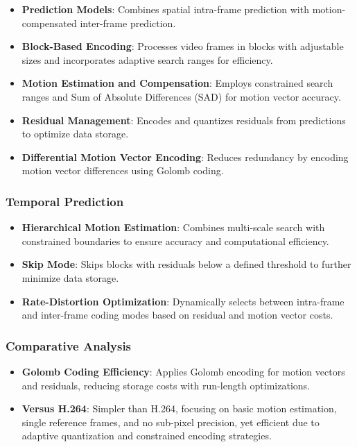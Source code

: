 \documentclass[a4paper,14pt]{article}
\begin{document}
\begin{itemize}
\item \textbf{Prediction Models}: Combines spatial intra-frame prediction with motion-compensated inter-frame prediction.
\item \textbf{Block-Based Encoding}: Processes video frames in blocks with adjustable sizes and incorporates adaptive search ranges for efficiency.
\item \textbf{Motion Estimation and Compensation}: Employs constrained search ranges and Sum of Absolute Differences (SAD) for motion vector accuracy.
\item \textbf{Residual Management}: Encodes and quantizes residuals from predictions to optimize data storage.
\item \textbf{Differential Motion Vector Encoding}: Reduces redundancy by encoding motion vector differences using Golomb coding.
\end{itemize}

\subsubsection{Temporal Prediction}
\begin{itemize}
\item \textbf{Hierarchical Motion Estimation}: Combines multi-scale search with constrained boundaries to ensure accuracy and computational efficiency.
\item \textbf{Skip Mode}: Skips blocks with residuals below a defined threshold to further minimize data storage.
\item \textbf{Rate-Distortion Optimization}: Dynamically selects between intra-frame and inter-frame coding modes based on residual and motion vector costs.
\end{itemize}

\subsubsection{Comparative Analysis}
\begin{itemize}
\item \textbf{Golomb Coding Efficiency}: Applies Golomb encoding for motion vectors and residuals, reducing storage costs with run-length optimizations.
\item \textbf{Versus H.264}: Simpler than H.264, focusing on basic motion estimation, single reference frames, and no sub-pixel precision, yet efficient due to adaptive quantization and constrained encoding strategies.
\end{itemize}
\end{document}
